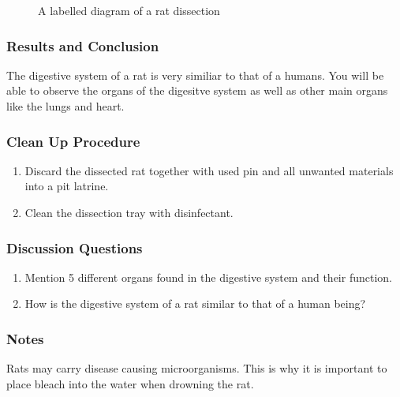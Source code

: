 \begin{figure}[h]
\begin{center}
\def\svgwidth{10cm}

\caption{A labelled diagram of a rat dissection}
\label{fig:rat-dissection}
\end{center}
\end{figure}

\subsubsection*{Results and Conclusion}
The digestive system of a rat is very similiar to that of a humans. You will be able to observe the organs of the digesitve system as well as other main organs like the lungs and heart.

\subsubsection*{Clean Up Procedure}
\begin{enumerate}
\item{Discard the dissected rat together with used pin and all unwanted materials into a pit latrine.}
\item{Clean the dissection tray with disinfectant.}
\end{enumerate}

\subsubsection*{Discussion Questions}
\begin{enumerate}
\item{Mention 5 different organs found in the digestive system and their function.}
\item{How is the digestive system of a rat similar to that of a human being?}
\end{enumerate}

\subsubsection*{Notes}
Rats may carry disease causing microorganisms. This is why it is important to place bleach into the water when drowning the rat.
